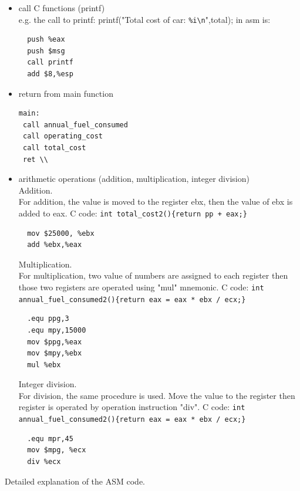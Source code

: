 \documentclass{article}
\begin{document}
\begin{itemize}
\begin{verbatim}
\end{verbatim}
\item 
call C functions (printf) \\
e.g. the call to printf: printf("Total cost of car: \verb|%i\n|",total); in asm is:
\begin{verbatim}  
  push %eax
  push $msg
  call printf
  add $8,%esp
\end{verbatim}
\item 
return from main function 
\begin{verbatim}  
main:
 call annual_fuel_consumed 
 call operating_cost 
 call total_cost 
 ret \\
\end{verbatim}
\item
arithmetic operations (addition, multiplication, integer division) \\
Addition. \\
For addition, the value is moved to the register ebx, then the value of ebx is added to eax. C code: \verb|int total_cost2(){return pp + eax;}|
\begin{verbatim}
  mov $25000, %ebx
  add %ebx,%eax 
\end{verbatim}
Multiplication. \\
For multiplication, two value of numbers are assigned to each register then those two registers are operated using "mul" mnemonic. C code: \verb|int annual_fuel_consumed2(){return eax = eax * ebx / ecx;}|
\begin{verbatim}
  .equ ppg,3 
  .equ mpy,15000  
  mov $ppg,%eax 
  mov $mpy,%ebx 
  mul %ebx 
\end{verbatim}
Integer division. \\
For division, the same procedure is used. Move the value to the register then register is operated by operation instruction "div". C code: \verb|int annual_fuel_consumed2(){return eax = eax * ebx / ecx;}|
\begin{verbatim}
  .equ mpr,45
  mov $mpg, %ecx
  div %ecx 
\end{verbatim}
\end{itemize}
\clearpage

\hypertarget{4}{Detailed explanation of the ASM code.} \\
\end{document}
